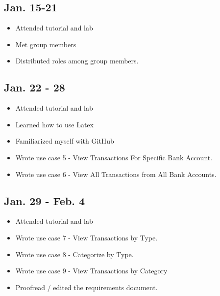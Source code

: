 \documentclass[12pt]{article}
\begin{document}
\maketitle

\subsection*{Jan. 15-21}

\begin{itemize}
\item Attended tutorial and lab
\item Met group members
\item Distributed roles among group members.
\end{itemize}
\subsection*{Jan. 22 - 28}

\begin{itemize}
    \item Attended tutorial and lab
    \item Learned how to use Latex
    \item Familiarized myself with GitHub   
    \item Wrote use case 5 - View Transactions For Specific Bank Account.
    \item Wrote use case 6 - View All Transactions from All Bank Accounts.
\end{itemize}

\subsection*{Jan. 29 - Feb. 4}

\begin{itemize}
    \item Attended tutorial and lab
    \item Wrote use case 7 - View Transactions by Type.
    \item Wrote use case 8 - Categorize by Type.
    \item Wrote use case 9 - View Transactions by Category
    \item Proofread / edited the requirements document.
\end{itemize}
\end{document}
